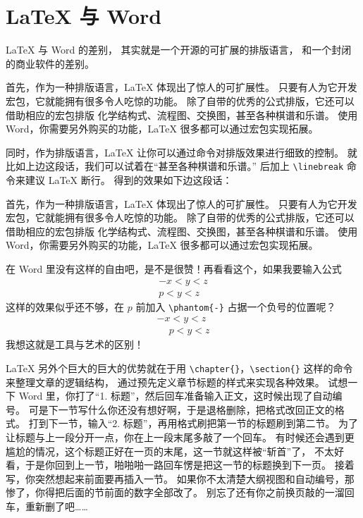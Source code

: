 \section{\LaTeX{} 与 Word}

\LaTeX{} 与 Word 的差别，
其实就是一个开源的可扩展的排版语言，
和一个封闭的商业软件的差别。

首先，作为一种排版语言，\LaTeX{} 体现出了惊人的可扩展性。
只要有人为它开发宏包，它就能拥有很多令人吃惊的功能。
除了自带的优秀的公式排版，它还可以借助相应的宏包排版
化学结构式、流程图、交换图，甚至各种棋谱和乐谱。
使用 Word，你需要另外购买的功能，\LaTeX{} 很多都可以通过宏包实现拓展。

同时，作为排版语言，\LaTeX{} 让你可以通过命令对排版效果进行细致的控制。
就比如上边这段话，我们可以试着在“甚至各种棋谱和乐谱。”
后加上 \verb|\linebreak| 命令来建议 \LaTeX{} 断行。
得到的效果如下边这段话：

首先，作为一种排版语言，\LaTeX{} 体现出了惊人的可扩展性。
只要有人为它开发宏包，它就能拥有很多令人吃惊的功能。
除了自带的优秀的公式排版，它还可以借助相应的宏包排版
化学结构式、流程图、交换图，甚至各种棋谱和乐谱。\linebreak
使用 Word，你需要另外购买的功能，\LaTeX{} 很多都可以通过宏包实现拓展。

在 Word 里没有这样的自由吧，是不是很赞！再看看这个，如果我要输入公式
\begin{gather*}
  -x<y<z \\ p<y<z
\end{gather*}
这样的效果似乎还不够，在 $p$ 前加入 \verb|\phantom{-}| 占据一个负号的位置呢？
\begin{gather*}
  -x<y<z \\ \phantom{-}p<y<z
\end{gather*}
我想这就是工具与艺术的区别！

\LaTeX{} 另外个巨大的巨大的优势就在于用
\verb|\chapter{}|，\verb|\section{}| 这样的命令来整理文章的逻辑结构，
通过预先定义章节标题的样式来实现各种效果。
试想一下 Word 里，你打了“1. 标题”，然后回车准备输入正文，这时候出现了自动编号。
可是下一节写什么你还没有想好啊，于是退格删除，把格式改回正文的格式。
打到下一节，输入“2. 标题”，再用格式刷把第一节的标题刷到第二节。
为了让标题与上一段分开一点，你在上一段末尾多敲了一个回车。
有时候还会遇到更尴尬的情况，这个标题正好在一页的末尾，这一节就这样被“斩首”了，
不太好看，于是你回到上一节，啪啪啪一路回车愣是把这一节的标题换到下一页。
接着写，你突然想起来前面要再插入一节。
如果你不太清楚大纲视图和自动编号，那惨了，你得把后面的节前面的数字全部改了。
别忘了还有你之前换页敲的一溜回车，重新删了吧……

